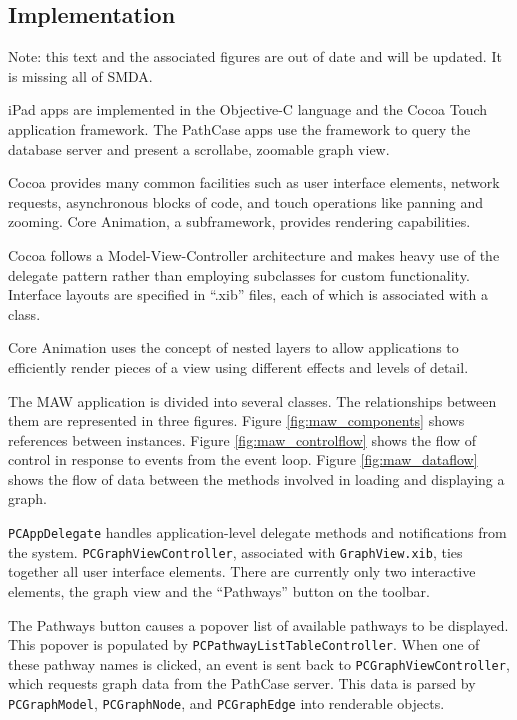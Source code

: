 \subsection{Implementation}
\label{sect:implementation}

Note: this text and the associated figures are out of date and will be updated.
It is missing all of SMDA.

iPad apps are implemented in the Objective-C language and the Cocoa Touch
application framework. The PathCase apps use the framework to query the database
server and present a scrollabe, zoomable graph view.

Cocoa provides many common facilities such as user interface elements, network
requests, asynchronous blocks of code, and touch operations like panning and
zooming. Core Animation, a subframework, provides rendering capabilities.

Cocoa follows a Model-View-Controller architecture and makes heavy use of the
delegate pattern rather than employing subclasses for custom functionality.
Interface layouts are specified in ``.xib'' files, each of which is associated
with a class. \cite{ios:application-programming-guide}

Core Animation uses the concept of nested layers to allow applications to
efficiently render pieces of a view using different effects and levels of
detail.  \cite{ios:core-animation}

The MAW application is divided into several classes. The relationships between
them are represented in three figures. Figure \ref{fig:maw_components} shows
references between instances. Figure \ref{fig:maw_controlflow} shows the flow of
control in response to events from the event loop. Figure \ref{fig:maw_dataflow}
shows the flow of data between the methods involved in loading and displaying a
graph.

\texttt{PCAppDelegate} handles application-level delegate methods and
notifications from the system.  \texttt{PCGraphViewController}, associated with
\texttt{GraphView.xib}, ties together all user interface elements. There are
currently only two interactive elements, the graph view and the ``Pathways''
button on the toolbar.

The Pathways button causes a popover list of available pathways to be displayed.
This popover is populated by \texttt{PCPathwayListTableController}. When one of
these pathway names is clicked, an event is sent back to
\texttt{PCGraphViewController}, which requests graph data from the PathCase
server. This data is parsed by \texttt{PCGraphModel}, \texttt{PCGraphNode}, and
\texttt{PCGraphEdge} into renderable objects.


